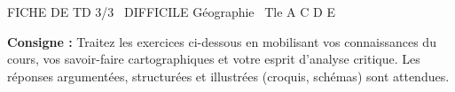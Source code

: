 \documentclass[11pt]{article}
\begin{document}
\begin{tcolorbox}[enhanced,colback=popink,colframe=popink,arc=10pt,boxrule=0pt,left=12pt,right=12pt,top=9pt,bottom=9pt]
{\color{white}\popxbold\small FICHE DE TD 3/3 \textbullet\ DIFFICILE \hfill Géographie \textbullet\ Tle A C D E\par}
\end{tcolorbox}
\vspace{4pt}
\noindent\textbf{Consigne :} Traitez les exercices ci-dessous en mobilisant vos connaissances du cours, vos savoir-faire cartographiques et votre esprit d'analyse critique. Les réponses argumentées, structurées et illustrées (croquis, schémas) sont attendues.
\end{document}
